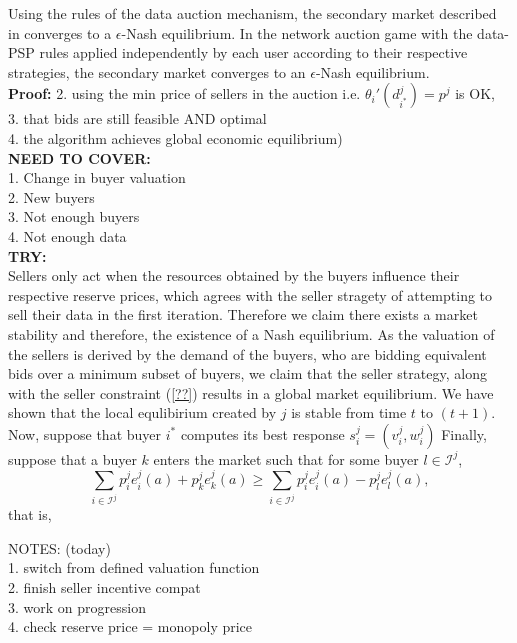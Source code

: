 \documentclass[12pt]{article}
\theoremstyle{definition}
\newcommand{\mcI}{\mathcal{I}}
\begin{document}
\begin{multicols}{2}
{
}

{
Using the rules of the data auction mechanism, the secondary market described in
\cite{zheng} converges to a $\epsilon$-Nash equilibrium. In the network auction
game with the data-PSP rules applied independently by each user according to their respective strategies, the secondary market converges to an $\epsilon$-Nash
equilibrium. 
}\\
\textbf{Proof:}
2. using the min price of sellers in the auction i.e. ${\theta_i}'(d_{i^*}^j) =
p^j$ is OK, \\
3. that bids are still feasible AND optimal \\
4. the algorithm achieves global economic equilibrium)\\
\textbf{NEED TO COVER:}\\
1. Change in buyer valuation \\
2. New buyers\\
3. Not enough buyers \\
4. Not enough data\\
\textbf{TRY:}\\
Sellers only act when the resources obtained by the buyers influence their
respective reserve prices, which agrees with the seller stragety of attempting
to sell their data in the first iteration. Therefore we claim there exists a
market stability and therefore, the existence of a Nash equilibrium. As the
valuation of the sellers is derived by the demand of the buyers, who are
bidding equivalent bids over a minimum subset of buyers, we claim that the seller
strategy, along with the seller constraint (\ref{??}) results in a global
market equilibrium.
We have shown that the local
equlibirium created by $j$ is stable from time $t$ to $(t+1)$. 
Now, suppose that buyer $i^*$ computes its best response $s_i^j = (v_i^j, w_i^j)$
Finally, suppose that
a buyer $k$ enters the market such that for some buyer $l\in\mcI^j$,
$$
    \displaystyle\sum_{i\in\mcI^j} p_i^je_i^j(a) + p_k^je_k^j(a) \ge
\sum_{i\in\mcI^j} p_i^je_i^j(a) - p_l^je_l^j(a),
$$
that is,



NOTES: (today)\\
1. switch from defined valuation function\\
2. finish seller incentive compat\\
3. work on progression\\
4. check reserve price = monopoly price


\end{multicols}
\end{document}
